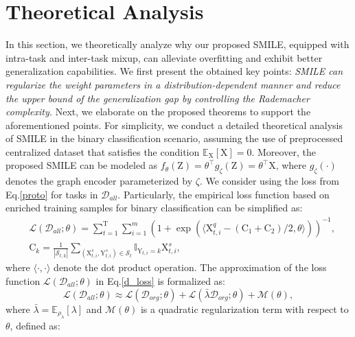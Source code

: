 \section{Theoretical Analysis}
\label{theorem_section}
In this section, we theoretically analyze why our proposed SMILE, equipped with intra-task and inter-task mixup, can alleviate overfitting and exhibit better generalization capabilities. We first present the obtained key points: \textit{SMILE can regularize the weight parameters in a distribution-dependent manner and reduce the upper bound of the generalization gap by controlling the Rademacher complexity.} Next, we elaborate on the proposed theorems to support the aforementioned points. %
For simplicity, we conduct a detailed theoretical analysis of SMILE in the binary classification scenario, assuming the use of preprocessed centralized dataset that satisfies the condition $\mathbb E_{\mathrm{X}}[\mathrm{X}]\!=\!0$. Moreover, the proposed SMILE can be modeled as $f_\theta(\mathrm{Z})\!=\!\theta^\top g_\zeta(\mathrm{Z})\!=\!\theta^\top \mathrm{X}$, where $g_\zeta(\cdot)$ denotes the graph encoder parameterized by $\zeta$. We consider using the loss from Eq.\ref{proto} for tasks in $\mathcal{D}_{all}$.
Particularly, the empirical loss function based on enriched training samples for binary classification can be simplified as: 
\begin{equation}
\label{d_loss}
\begin{aligned}
    &\mathcal{L}(\mathcal{D}_{all};\theta)\!=\!\sum_{t=1}^\mathrm{T}\sum_{i=1}^m(1\!+\!\exp(\langle\mathrm{X}_{t,i}^q\!-\!(\mathrm{C}_1\!+\!\mathrm{C}_2)/2,\theta\rangle))^{-1}, \\
    &\mathrm{C}_k\!=\!\frac{1}{|\mathcal{S}_{t,k}|}\sum_{(\mathrm{X}_{t,i}^s,\mathrm{Y}_{t,i}^s)\in\mathcal{S}_{t}}\mathbb{I}_{\mathrm{Y}_{t,i}=k}\mathrm{X}_{t,i}^s,
\end{aligned}
\end{equation}
where $\langle\cdot,\cdot\rangle$ denote the dot product operation. The approximation of the loss function $\mathcal{L}(\mathcal{D}_{all};\theta)$ in Eq.\ref{d_loss} is formalized as:
\begin{equation}
    \label{loss_appro}\mathcal{L}(\mathcal{D}_{all};\theta)\approx
    \mathcal{L}(\mathcal{D}_{org};\theta)\!+\!\mathcal{L}(\bar{\lambda}\mathcal{D}_{org};\theta)\!+\!\mathcal{M}(\theta),
\end{equation}
where $\bar{\lambda}\!=\!\mathbb E_{\rho_\lambda}[\lambda]$ and $\mathcal{M}(\theta)$ is a quadratic regularization term with respect to $\theta$, defined as: 
